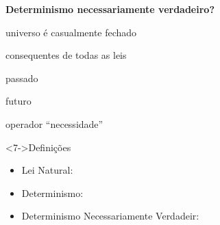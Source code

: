 \begin{frame}{\textbf{Determinismo necessariamente verdadeiro?}}
	\begin{description}
	 \item<2->[$u$:] universo é casualmente fechado
		\item<3->[$p$:] consequentes de todas as leis
		\item<4->[$\ell$:] passado
		\item<5->[$f$:] futuro
		\item<6->[$\square$:] operador ``necessidade''
	\end{description}
	\centering
	\begin{minipage}{\textwidth}
     \begin{exampleblock}<7->{Definições}
	  \begin{itemize}
		 \item<8-> \textcolor{NordYellow}{Lei Natural}: \only<9->{$u\rightarrow p$}
		 \item<10-> \textcolor{NordYellow}{Determinismo}: \only<11->{$[(u\rightarrow p) \wedge \ell]\rightarrow f$}
		 \item<12-> \textcolor{NordYellow}{Determinismo Necessariamente Verdadeir}: \only<13->{$\square\left\{\,[(u\rightarrow p) \wedge \ell]\rightarrow f\,\right\}$}
	  \end{itemize}
	 \end{exampleblock}
	\end{minipage}
\end{frame}

